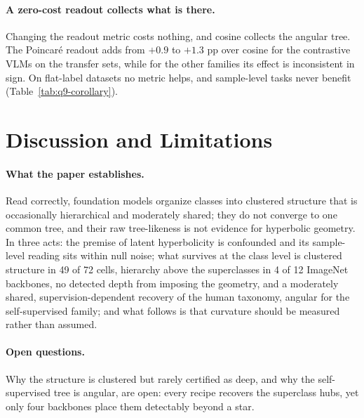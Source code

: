 \documentclass{article}
\theoremstyle{definition}
\begin{document}
\paragraph{A zero-cost readout collects what is there.} Changing the readout metric costs nothing, and cosine collects the angular tree. The Poincar\'{e} readout adds from $+0.9$ to $+1.3$ pp over cosine for the contrastive VLMs on the transfer sets, while for the other families its effect is inconsistent in sign. On flat-label datasets no metric helps, and sample-level tasks never benefit (Table~\ref{tab:q9-corollary}). %

\section{Discussion and Limitations}
\label{sec:discussion}

\paragraph{What the paper establishes.} Read correctly, foundation models organize classes into clustered structure that is occasionally hierarchical and moderately shared; they do not converge to one common tree, and their raw tree-likeness is not evidence for hyperbolic geometry. In three acts: the premise of latent hyperbolicity is confounded and its sample-level reading sits within null noise; what survives at the class level is clustered structure in 49 of 72 cells, hierarchy above the superclasses in 4 of 12 ImageNet backbones, no detected depth from imposing the geometry, and a moderately shared, supervision-dependent recovery of the human taxonomy, angular for the self-supervised family; and what follows is that curvature should be measured rather than assumed.

\paragraph{Open questions.} Why the structure is clustered but rarely certified as deep, and why the self-supervised tree is angular, are open: every recipe recovers the superclass hubs, yet only four backbones place them detectably beyond a star.
\end{document}
